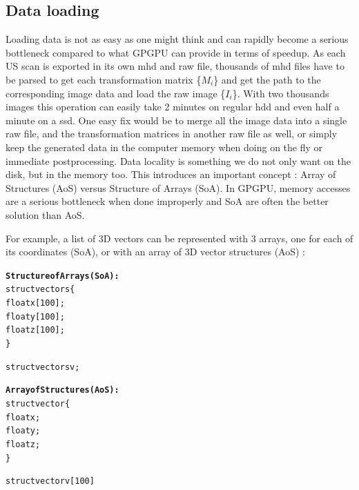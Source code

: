 \documentclass[12pt,journal,compsoc]{IEEEtran}
\begin{document}
\subsection{Data loading}

Loading data is not as easy as one might think and can rapidly become a serious bottleneck compared to what GPGPU can provide in terms of speedup. 
As each US scan is exported in its own mhd and raw file, thousands of mhd files have to be parsed to get each transformation matrix \{$M_i$\} and get the path to the corresponding image data and load the raw image \{$I_i$\}.  
With two thousands images this operation can easily take 2 minutes on regular \ac{hdd} and even half a minute on a \ac{ssd}.
One easy fix would be to merge all the image data into a single raw file, and the transformation matrices in another raw file as well, or simply keep the generated data in the computer memory when doing on the fly or immediate postprocessing.
Data locality is something we do not only want on the disk, but in the memory too. This introduces an important concept : Array of Structures (AoS) versus Structure of Arrays (SoA). In GPGPU, memory accesses are a serious bottleneck when done improperly and SoA are often the better solution than AoS. 

For example, a list of 3D vectors can be represented with 3 arrays, one for each of its coordinates (SoA), or with an array of 3D vector structures (AoS) :

\begin{samepage}
\begin{alltt}
\textbf{Structure of Arrays (SoA):}
struct vectors \{
    float x[100];
    float y[100];
    float z[100];
\}

struct vectors v;

\textbf{Array of Structures (AoS):}
struct vector \{
    float x;
    float y;
    float z;
\}

struct vector v[100]
\end{alltt}
\end{samepage}
\end{document}
